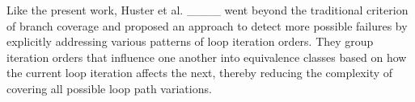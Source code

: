 Like the present work, Huster et al. ____ went beyond the traditional criterion of branch coverage and proposed an approach to detect more possible failures by explicitly addressing various patterns of loop iteration orders. They group iteration orders that influence one another into equivalence classes based on how the current loop iteration affects the next, thereby reducing the complexity of covering all possible loop path variations.